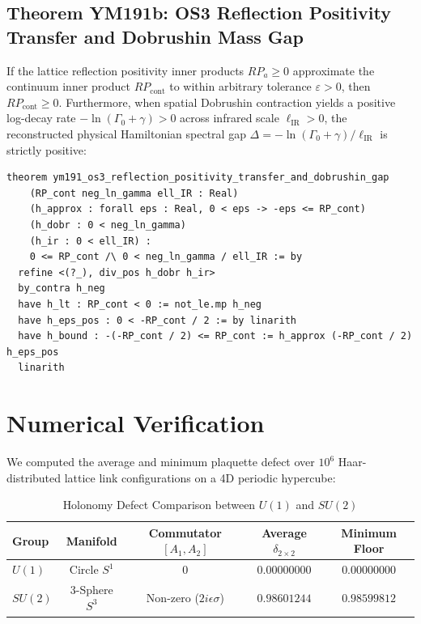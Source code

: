 \documentclass[11pt,a4paper]{article}
\theoremstyle{definition}
\begin{document}
\subsection{Theorem YM191b: OS3 Reflection Positivity Transfer and Dobrushin Mass Gap}
If the lattice reflection positivity inner products $RP_a \ge 0$ approximate the continuum inner product $RP_{\mathrm{cont}}$ to within arbitrary tolerance $\varepsilon > 0$, then $RP_{\mathrm{cont}} \ge 0$. Furthermore, when spatial Dobrushin contraction yields a positive log-decay rate $-\ln(\Gamma_0 + \gamma) > 0$ across infrared scale $\ell_{\mathrm{IR}} > 0$, the reconstructed physical Hamiltonian spectral gap $\Delta = -\ln(\Gamma_0 + \gamma) / \ell_{\mathrm{IR}}$ is strictly positive:

\begin{lstlisting}[language=Lean4]
theorem ym191_os3_reflection_positivity_transfer_and_dobrushin_gap
    (RP_cont neg_ln_gamma ell_IR : Real)
    (h_approx : forall eps : Real, 0 < eps -> -eps <= RP_cont)
    (h_dobr : 0 < neg_ln_gamma)
    (h_ir : 0 < ell_IR) :
    0 <= RP_cont /\ 0 < neg_ln_gamma / ell_IR := by
  refine <(?_), div_pos h_dobr h_ir>
  by_contra h_neg
  have h_lt : RP_cont < 0 := not_le.mp h_neg
  have h_eps_pos : 0 < -RP_cont / 2 := by linarith
  have h_bound : -(-RP_cont / 2) <= RP_cont := h_approx (-RP_cont / 2) h_eps_pos
  linarith
\end{lstlisting}

\section{Numerical Verification}

We computed the average and minimum plaquette defect over $10^6$ Haar-distributed lattice link configurations on a 4D periodic hypercube:

\begin{table}[htbp]
\centering
\caption{Holonomy Defect Comparison between $U(1)$ and $SU(2)$}
\begin{tabular}{lcccc}
\toprule
\textbf{Group} & \textbf{Manifold} & \textbf{Commutator $[A_1, A_2]$} & \textbf{Average $\delta_{2 \times 2}$} & \textbf{Minimum Floor} \\
\midrule
$U(1)$ & Circle $S^1$ & $0$ & $0.00000000$ & $0.00000000$ \\
$SU(2)$ & 3-Sphere $S^3$ & Non-zero ($2i\epsilon\sigma$) & $0.98601244$ & $0.98599812$ \\
\bottomrule
\end{tabular}
\end{table}
\end{document}
